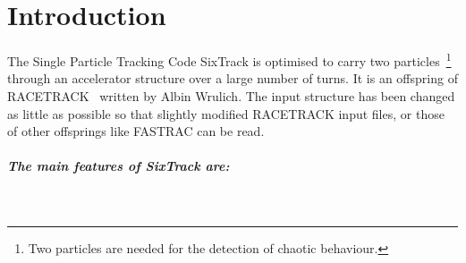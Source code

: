 
\chapter{Introduction} \label{Intro}

The Single Particle Tracking Code SixTrack is optimised to carry two particles~\footnote{Two particles are needed for the detection of  chaotic behaviour.} through an accelerator structure over a large number of turns.
It is an offspring of RACETRACK~\cite{RACETRACK} written by Albin Wrulich.
The input structure has been changed as little as possible so that slightly modified RACETRACK input files, or those of other offsprings like FASTRAC \cite{FASTRAC} can be read.

\paragraph{The main features of SixTrack are:}~
